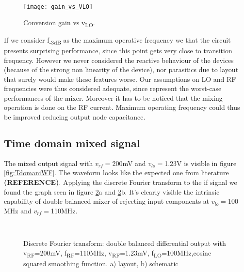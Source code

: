 \begin{figure}[H]
	\centering
	\texttt{[image: gain\_vs\_VLO]}
	\caption{Conversion gain vs v\textsubscript{LO}.}
	\label{fig:maxGainvsLO}
\end{figure}

If we consider f\textsubscript{-3dB} as the maximum operative frequency we that the circuit presents surprising performance, since this point gets very close to transition frequency. However we never considered the reactive behaviour of the devices (because of the strong non linearity of the device), nor parasitics due to layout that surely would make these features worse.
Our assumptions on LO and RF frequencies were thus considered adequate, since represent the worst-case performances of the mixer. Moreover it has to be noticed that the mixing operation is done on the RF current. Maximum operating frequency could thus be improved reducing output node capacitance. 

\subsection{Time domain mixed signal}
The mixed output signal with \(v_{rf}=\)200mV and \(v_{lo}=\)1.23V is visible in figure \ref{fig:TdomaniWF}. The waveform looks like the expected one from literature \textbf{(REFERENCE)}.
Applying the discrete Fourier transform to the if signal we found the graph seen in figure \ref{fig:TdomaniDFT}a and \ref{fig:TdomaniDFT}b.
It's clearly visible the intrinsic capability of double balanced mixer of rejecting input components at \(v_{lo}=100\)MHz and \(v_{rf}=\)110MHz.

\begin{figure}[H] 
	\centering
	 \\
	\caption{Discrete Fourier transform: double balanced differential output with v\textsubscript{RF}=200mV,  f\textsubscript{RF}=110MHz, v\textsubscript{RF}=1.23mV, f\textsubscript{LO}=100MHz,cosine squared smoothing function. a) layout, b) schematic}
	\label{fig:TdomaniDFT}
\end{figure}


